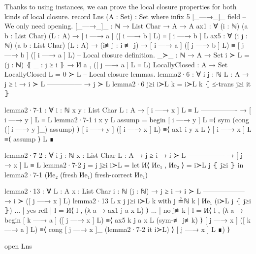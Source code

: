 \documentclass[logo,bsc,singlespacing,parskip,online]{infthesis}
\renewenvironment{code}{\mintedcopy[breaklines,breaksymbolleft=\;]{agda}}{\endmintedcopy}
\begin{document}
Thanks to using instances, we can prove the local closure properties for both kinds of local
closure.
\begin{code}
  record Lns (A : Set) : Set where
    infix 5 [_—→_]_
    field
      -- We only need opening.
      [_—→_]_ : ℕ → List Char → A → A
      ax1 : ∀ (i : ℕ) (a b : List Char) (L : A)
        → [ i —→ a ] ([ i —→ b ] L) ≡ [ i —→ b ] L
      ax5 : ∀ (i j : ℕ) (a b : List Char) (L : A)
        → (i≢j : i ≢ j)
        → [ i —→ a ] ([ j —→ b ] L) ≡ [ j —→ b ] ([ i —→ a ] L)
    -- Local closure definition.
    _≻_ : ℕ → A → Set
    i ≻ L = (j : ℕ) ⦃ _ : j ≥ i ⦄ → И a , ([ j —→ a ] L ≡ L)
    LocallyClosed : A → Set
    LocallyClosed L = 0 ≻ L
    -- Local closure lemmas.
    lemma2·6 : ∀ {i j : ℕ} {L : A}
      → j ≥ i   → i ≻ L
        ---------------
      → j ≻ L
    lemma2·6 j≥i i≻L k = i≻L k ⦃ ≤-trans j≥i it ⦄

    lemma2·7-1 : ∀ {i : ℕ} {x y : List Char} {L : A}
      → [ i —→ x ] L ≡ L
        ----------------
      → [ i —→ y ] L ≡ L
    lemma2·7-1 {i} {x} {y} {L} assump =
      begin
        [ i —→ y ] L
      ≡⟨ sym (cong ([ i —→ y ]_) assump) ⟩
        [ i —→ y ] ([ i —→ x ] L)
      ≡⟨ ax1 i y x L ⟩
        [ i —→ x ] L
      ≡⟨ assump ⟩
        L
      ∎
      
    lemma2·7-2 : ∀ {i j : ℕ} {x : List Char} {L : A}
      → j ≥ i → i ≻ L
        ----------------
      → [ j —→ x ] L ≡ L
    lemma2·7-2 {j = j} j≥i i≻L =
      let И⟨ Иe₁ , Иe₂ ⟩ = i≻L j ⦃ j≥i ⦄ in
        lemma2·7-1 (Иe₂ (fresh Иe₁) {fresh-correct Иe₁})

    lemma2·13 : ∀ {L : A} {x : List Char} {i : ℕ} (j : ℕ)
      → j ≥ i      → i ≻ L
        ------------------
      → i ≻ ([ j —→ x ] L)
    lemma2·13 {L} {x} j j≥i i≻L k
      with j ≟ℕ k | Иe₁ (i≻L j ⦃ j≥i ⦄)
    ... | yes refl | l = И⟨ l , (λ a → ax1 j a x L) ⟩
    ... | no  j≢k  | l = И⟨ l , (λ a → 
      begin
        [ k —→ a ] ([ j —→ x ] L)
      ≡⟨ ax5 k j a x L (sym-≢ j≢k) ⟩
        [ j —→ x ] ([ k —→ a ] L)
      ≡⟨ cong [ j —→ x ]_ (lemma2·7-2 it i≻L) ⟩
        [ j —→ x ] L
      ∎) ⟩

  open Lns
\end{code}
\end{document}
